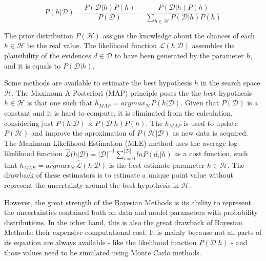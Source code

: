\begin{equation}
    P(h|\mathcal{D}) = \frac{P(\mathcal{D}|h) P(h)}{P(\mathcal{D})} = \frac{P(\mathcal{D}|h) P(h)}{\sum_{h \in \mathcal{H}}P(\mathcal{D}|h)P(h)}
    \label{eqn:bayes}
\end{equation}

The prior distribution $P(\mathcal{H})$ assigns the knowledge about the chances of each $h \in \mathcal{H}$ be the real value. The likelihood function $\mathcal{L}(h|\mathcal{D})$ assembles the plausibility of the evidences $d \in \mathcal{D}$ to have been generated by the parameter $h$, and it is equals to $P(\mathcal{D}|h)$.

Some methods are available to estimate the best hypothesis $h$ in the search space $\mathcal{H}$. The Maximum A Posteriori (MAP) principle poses the the best hypothesis $h \in \mathcal{H}$ is that one such that $h_{MAP} = argmax_\mathcal{H} P(h|\mathcal{D})$. Given that $P(\mathcal{D})$ is a constant and it is hard to compute, it is eliminated from the calculation, considering just $P(h|\mathcal{D}) \propto P(\mathcal{D}|h) P(h)$. The $h_{MAP}$ is used to update $P(\mathcal{H})$ and improve the aproximation of $P(\mathcal{H}|\mathcal{D})$ as new data is acquired. The Maximum Likelihood Estimation (MLE) method uses the average log-likelihood function $\hat{\mathcal{L}}(h|\mathcal{D}) =  |\mathcal{D}|^{-1}\sum_{i=0}^{|\mathcal{D}|} ln P(d_i|h)$ as a cost function, such that $h_{MLE} = argmax_\mathcal{H} \hat{\mathcal{L}}(h|\mathcal{D})$ is the best estimate parameter $h\in\mathcal{H}$. The drawback of these estimators is to estimate a unique point value without represent the uncertainty around the best hypothesis in $\mathcal{H}$.

However, the great strength of the Bayesian Methods is its ability to represent the uncertainties contained both on data and model parameters with probability distributions. In the other hand, this is also the great drawback of Bayesian Methods: their expensive computational cost. It is mainly because not all parts of its equation are always available - like the likelihood function $P(\mathcal{D}|h)$ - and those values need to be simulated using Monte Carlo methods.


